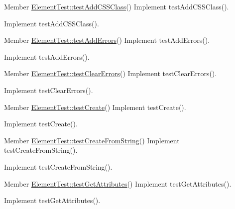 \begin{DoxyDescription}
\item[Member \hyperlink{class_element_test_a18b0e22d475b12dc3f9291c62eb121b3}{ElementTest::testAddCSSClass}() ]Implement testAddCSSClass().

Implement testAddCSSClass().
\end{DoxyDescription}

\label{todo__todo000137}
\hypertarget{todo__todo000137}{}
 
\begin{DoxyDescription}
\item[Member \hyperlink{class_element_test_a352e9d06ff4408b8a3c991f21c70722e}{ElementTest::testAddErrors}() ]Implement testAddErrors().

Implement testAddErrors().
\end{DoxyDescription}

\label{todo__todo000138}
\hypertarget{todo__todo000138}{}
 
\begin{DoxyDescription}
\item[Member \hyperlink{class_element_test_a8e813e63186370156c7aca5763fbd684}{ElementTest::testClearErrors}() ]Implement testClearErrors().

Implement testClearErrors().
\end{DoxyDescription}

\label{todo__todo000139}
\hypertarget{todo__todo000139}{}
 
\begin{DoxyDescription}
\item[Member \hyperlink{class_element_test_a9842d425e801b4ff5633ad4c24bfc359}{ElementTest::testCreate}() ]Implement testCreate().

Implement testCreate().
\end{DoxyDescription}

\label{todo__todo000140}
\hypertarget{todo__todo000140}{}
 
\begin{DoxyDescription}
\item[Member \hyperlink{class_element_test_a3cad92cb6bdb781785d7a04444d6fd6e}{ElementTest::testCreateFromString}() ]Implement testCreateFromString().

Implement testCreateFromString().
\end{DoxyDescription}

\label{todo__todo000125}
\hypertarget{todo__todo000125}{}
 
\begin{DoxyDescription}
\item[Member \hyperlink{class_element_test_aa3715e2191c6f99c926f1af9fa784eb5}{ElementTest::testGetAttributes}() ]Implement testGetAttributes().

Implement testGetAttributes().
\end{DoxyDescription}

